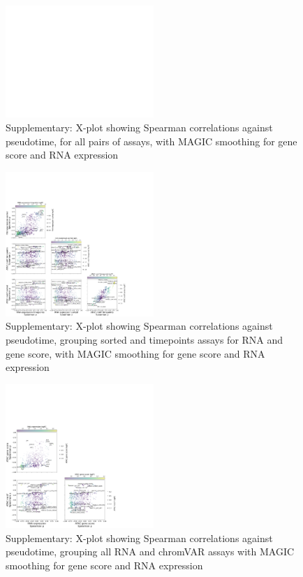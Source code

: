 \documentclass[a4paper]{article}
\begin{document}
\begin{figure}[!htb]
  \centering
  \includegraphics[width=0.5\textwidth]{../figures/hematopoiesis/Monocyte_40_15_smooth_magic_detailed_X_plot.png}
  \caption{Supplementary: X-plot showing Spearman correlations against pseudotime, for all pairs of assays, with MAGIC smoothing for gene score and RNA expression}
\end{figure}

\begin{figure}[!htb]
  \centering
  \includegraphics[width=0.5\textwidth]{../figures/hematopoiesis/Monocyte_40_15_smooth_magic_semi_detailed_X_plot.png}
  \caption{Supplementary: X-plot showing Spearman correlations against pseudotime, grouping sorted and timepoints assays for RNA and gene score, with MAGIC smoothing for gene score and RNA expression}
\end{figure}

\begin{figure}[!htb]
  \centering
  \includegraphics[width=0.5\textwidth]{../figures/hematopoiesis/Monocyte_40_15_smooth_magic_grouped_X_plot.png}
  \caption{Supplementary: X-plot showing Spearman correlations against pseudotime, grouping all RNA and chromVAR assays with MAGIC smoothing for gene score and RNA expression}
\end{figure}
\end{document}
